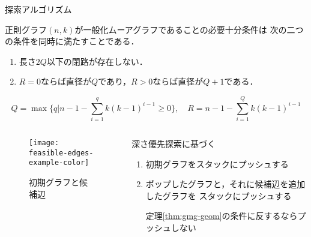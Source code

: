 \begin{frame}[allowframebreaks]{探索アルゴリズム}
  \begin{theorem}
    \label{thm:gmg-geom}
    {\scriptsize
    正則グラフ$(n,k)$が一般化ムーアグラフであることの必要十分条件は
    次の二つの条件を同時に満たすことである．
    \begin{enumerate}
    \item 長さ$2Q$以下の閉路が存在しない．
      \label{itm:gmg-geom-1}
    \item $R=0$ならば直径が$Q$であり，$R>0$ならば直径が$Q+1$である．
      \label{itm:gmg-geom-2}
    \end{enumerate}
    \[ Q=\max\{q|n-1-\sum_{i=1}^{q}k(k-1)^{i-1}\geq 0\},\quad
    R=n-1-\sum_{i=1}^{Q}k(k-1)^{i-1} \]
    }
  \end{theorem}
  \vspace*{-1em}
  \begin{columns}
    \begin{column}{.4\textwidth}
      \begin{figure}
        \centering
        \texttt{[image: feasible-edges-example-color]}
        \caption{初期グラフと候補辺}
      \end{figure}
    \end{column}
    \begin{column}{.6\textwidth}
      \small
      \par 深さ優先探索に基づく
      \begin{enumerate}
      \item 初期グラフをスタックにプッシュする
      \item ポップしたグラフと，それに候補辺を追加したグラフを
        スタックにプッシュする
      \par 定理\ref{thm:gmg-geom}の条件に反するならプッシュしない
      \end{enumerate}
    \end{column}
  \end{columns}
\end{frame}

